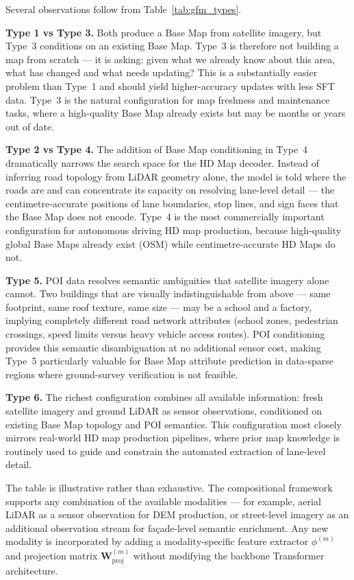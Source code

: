 \documentclass{book}
\begin{document}
Several observations follow from Table~\ref{tab:gfm_types}.

\textbf{Type 1 vs Type 3.}  Both produce a Base Map from satellite
imagery, but Type~3 conditions on an existing Base Map.  Type~3 is
therefore not building a map from scratch --- it is asking: given
what we already know about this area, what has changed and what
needs updating?  This is a substantially easier problem than Type~1
and should yield higher-accuracy updates with less SFT data.
Type~3 is the natural configuration for map freshness and
maintenance tasks, where a high-quality Base Map already exists
but may be months or years out of date.

\textbf{Type 2 vs Type 4.}  The addition of Base Map conditioning
in Type~4 dramatically narrows the search space for the HD Map
decoder.  Instead of inferring road topology from LiDAR geometry
alone, the model is told where the roads are and can concentrate
its capacity on resolving lane-level detail --- the
centimetre-accurate positions of lane boundaries, stop lines, and
sign faces that the Base Map does not encode.  Type~4 is the most
commercially important configuration for autonomous driving HD
map production, because high-quality global Base Maps already
exist (OSM) while centimetre-accurate HD Maps do not.

\textbf{Type 5.}  POI data resolves semantic ambiguities that
satellite imagery alone cannot.  Two buildings that are visually
indistinguishable from above --- same footprint, same roof texture,
same size --- may be a school and a factory, implying completely
different road network attributes (school zones, pedestrian
crossings, speed limits versus heavy vehicle access routes).  POI
conditioning provides this semantic disambiguation at no additional
sensor cost, making Type~5 particularly valuable for Base Map
attribute prediction in data-sparse regions where ground-survey
verification is not feasible.

\textbf{Type 6.}  The richest configuration combines all available
information: fresh satellite imagery and ground LiDAR as sensor
observations, conditioned on existing Base Map topology and POI
semantics.  This configuration most closely mirrors real-world HD
map production pipelines, where prior map knowledge is routinely used to guide and
constrain the automated extraction of lane-level detail.

The table is illustrative rather than exhaustive.  The
compositional framework supports any combination of the available
modalities --- for example, aerial LiDAR as a sensor observation
for DEM production, or street-level imagery as an additional
observation stream for façade-level semantic enrichment.  Any new
modality is incorporated by adding a modality-specific feature
extractor $\phi^{(m)}$ and projection matrix
$\mathbf{W}^{(m)}_{\text{proj}}$ without modifying the backbone
Transformer architecture.
\end{document}
